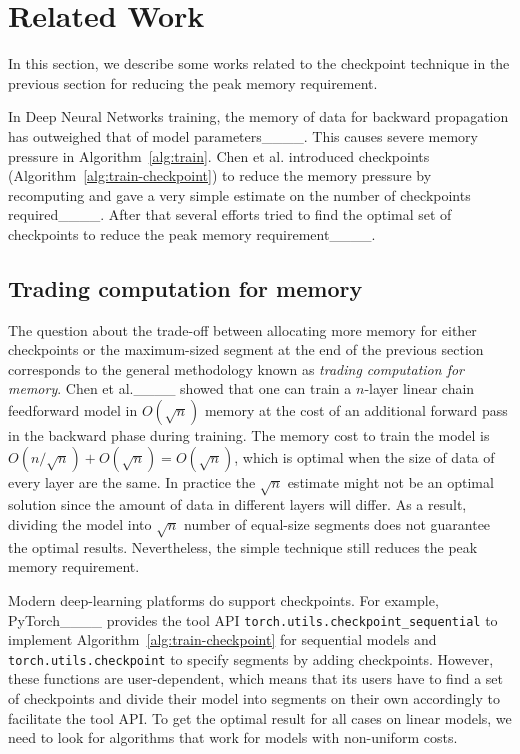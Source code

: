 \section{Related Work}
\label{sec:related}

In this section, we describe some works related to the checkpoint technique in the previous section for reducing the peak memory requirement.

In Deep Neural Networks training, the memory of data for backward propagation has outweighed that of model parameters____. 
This causes severe memory pressure in Algorithm~\ref{alg:train}. 
Chen et al. introduced checkpoints (Algorithm~\ref{alg:train-checkpoint}) to reduce the memory pressure by recomputing and gave a very simple estimate on the number of checkpoints required____.
After that several efforts tried to find the optimal set of checkpoints to reduce the peak memory requirement____. 

\subsection{Trading computation for memory}

The question about the trade-off between allocating more memory for either checkpoints or the maximum-sized segment at the end of the previous section corresponds to the general methodology known as {\em trading computation for memory}.
Chen et al.____ showed that one can train a $n$-layer linear chain feedforward model in $O(\sqrt{n})$ memory at the cost of an additional forward pass in the backward phase during training.
The memory cost to train the model is $O(n/\sqrt{n})+O(\sqrt{n}) = O(\sqrt{n})$, which is optimal when the size of data of every layer are the same.
In practice the $\sqrt{n}$ estimate might not be an optimal solution since the amount of data in different layers will differ.
As a result, dividing the model into $\sqrt{n}$ number of equal-size segments does not guarantee the optimal results.
Nevertheless, the simple technique still reduces the peak memory requirement.

Modern deep-learning platforms do support checkpoints.
For example, PyTorch____ provides the tool API \texttt{torch.utils.checkpoint\_sequential} to implement Algorithm~\ref{alg:train-checkpoint} for sequential models and \texttt{torch.utils.checkpoint} to specify segments by adding checkpoints.
However, these functions are user-dependent, which means that its users have to find a set of checkpoints and divide their model into segments on their own accordingly to facilitate the tool API. To get the optimal result for all cases on linear models, we need to look for algorithms that work for models with non-uniform costs.

